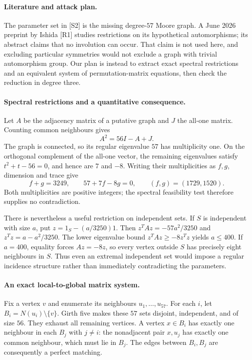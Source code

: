 \documentclass[11pt,a4paper]{article}
\begin{document}
\paragraph{Literature and attack plan.}
The parameter set in [S2] is the missing degree-$57$ Moore graph.
A June 2026 preprint by Ishida [R1] studies restrictions on its
hypothetical automorphisms; its abstract claims that no involution can
occur. That claim is not used here, and excluding particular symmetries
would not exclude a graph with trivial automorphism group. Our plan is
instead to extract exact spectral restrictions and an equivalent system
of permutation-matrix equations, then check the reduction in degree three.

\paragraph{Spectral restrictions and a quantitative consequence.}
Let $A$ be the adjacency matrix of a putative graph and $J$ the all-one
matrix. Counting common neighbours gives
\[
 A^2=56I-A+J.
\]
The graph is connected, so its regular eigenvalue $57$ has multiplicity
one. On the orthogonal complement of the all-one vector, the remaining
eigenvalues satisfy $t^2+t-56=0$, and hence are $7$ and $-8$.
Writing their multiplicities as $f,g$, dimension and trace give
\[
 f+g=3249,\qquad 57+7f-8g=0,
 \qquad(f,g)=(1729,1520).
\]
Both multiplicities are positive integers; the spectral feasibility test
therefore supplies no contradiction.

There is nevertheless a useful restriction on independent sets. If $S$
is independent with size $a$, put $z=1_S-(a/3250)1$. Then
$z^TAz=-57a^2/3250$ and $z^Tz=a-a^2/3250$. The lower eigenvalue bound
$z^TAz\ge-8z^Tz$ yields $a\le400$. If $a=400$, equality forces
$Az=-8z$, so every vertex outside $S$ has precisely eight neighbours in
$S$. Thus even an extremal independent set would impose a regular
incidence structure rather than immediately contradicting the parameters.

\paragraph{An exact local-to-global matrix system.}
Fix a vertex $v$ and enumerate its neighbours $u_1,\ldots,u_{57}$.
For each $i$, let $B_i=N(u_i)\setminus\{v\}$. Girth five makes these
$57$ sets disjoint, independent, and of size $56$. They exhaust all
remaining vertices. A vertex $x\in B_i$ has exactly one neighbour in
each $B_j$ with $j\ne i$: the nonadjacent pair $x,u_j$ has exactly
one common neighbour, which must lie in $B_j$. The edges between
$B_i,B_j$ are consequently a perfect matching.
\end{document}

